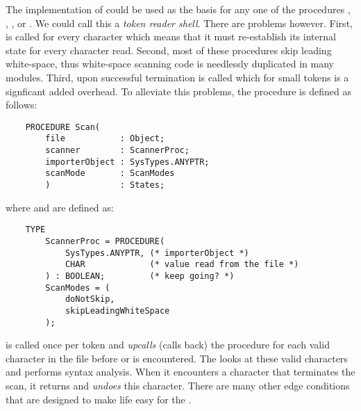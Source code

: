 The implementation of  could be used as
the basis for any one of the procedures
, ,
, or .
We could call this a {\em token reader shell}.
There are problems however.  First, 
is called for every character which means that it must
re-establish its internal state for every character read.
Second, most of these procedures skip leading white-space,
thus white-space scanning code is needlessly duplicated 
in many modules.  Third, upon successful termination
 is called which for small tokens is a
signficant added overhead.  To alleviate this problems,
the procedure  is defined as follows:
\begin{verbatim}
    PROCEDURE Scan(
        file           : Object;
        scanner        : ScannerProc;
        importerObject : SysTypes.ANYPTR;
        scanMode       : ScanModes
        )              : States;
\end{verbatim}
where  and  are
defined as:
\begin{verbatim}
    TYPE
        ScannerProc = PROCEDURE(
            SysTypes.ANYPTR, (* importerObject *)
            CHAR             (* value read from the file *)
        ) : BOOLEAN;         (* keep going? *)
        ScanModes = (
            doNotSkip,
            skipLeadingWhiteSpace
        );
\end{verbatim}

 is called once per token and {\em upcalls} (calls back)
the procedure  for each valid character in
the file before  or 
is encountered.  The  looks at these valid characters
and performs syntax analysis.  When it encounters a character that
terminates the scan, it returns  and  {\em undoes}
this character.  There are many other edge conditions that are designed
to make life easy for the .

